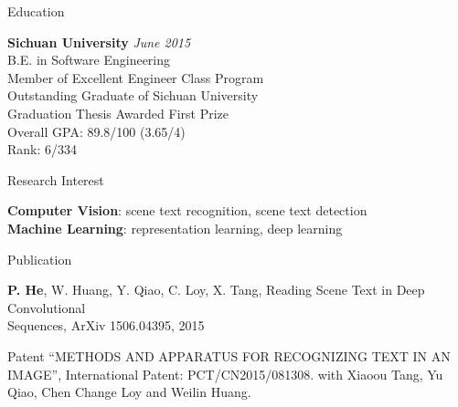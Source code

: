 \documentclass{resume} %
\begin{document}

\begin{rSection}{Education}

{\bf Sichuan University} \hfill {\em June 2015} \\ 
B.E. in Software Engineering \\
Member of Excellent Engineer Class Program\\
Outstanding Graduate of Sichuan University \\
Graduation Thesis Awarded First Prize \\
Overall GPA: 89.8/100 (3.65/4) \\
Rank: 6/334

\end{rSection}


\begin{rSection}{Research Interest}

\textbf{Computer Vision}: scene text recognition, scene text detection \\
\textbf{Machine Learning}: representation learning, deep learning

\end{rSection}



\begin{rSection}{Publication}

\textbf{P. He}, W. Huang, Y. Qiao, C. Loy, X. Tang, Reading Scene Text in Deep Convolutional \\Sequences, ArXiv 1506.04395, 2015


\end{rSection}


\begin{rSection}{Patent}
``METHODS AND APPARATUS FOR RECOGNIZING TEXT IN AN IMAGE'', International Patent: PCT/CN2015/081308.
with Xiaoou Tang, Yu Qiao, Chen Change Loy and Weilin Huang.
\end{rSection}
\end{document}
